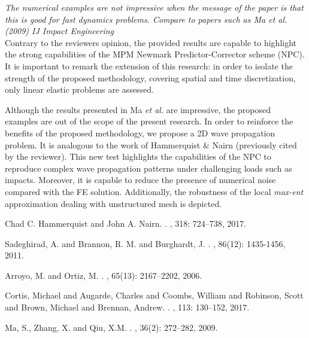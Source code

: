\documentclass[12pt]{article}
\begin{document}
 \textit{The numerical examples are not impressive when the message of the paper is that this is good for fast dynamics problems. Compare to papers such as Ma et al. (2009) IJ Impact Engineering}\\

Contrary to the reviewer\textquotesingle s opinion, the provided results are capable to highlight the strong capabilities of the MPM Newmark Predictor-Corrector scheme (NPC). It is important to remark the extension of this research: in order to isolate the strength of the proposed methodology, covering spatial and time discretization, only linear elastic problems are assessed. 

Although the results presented in Ma {\it et al.} \cite{MA2009272} are impressive, the proposed examples are out of the scope of the present research. In order to reinforce the benefits of the proposed methodology, we propose a 2D wave propagation problem. It is analogous to the work of Hammerquist \& Nairn \cite{HAMMERQUIST2017724} (previously cited by the reviewer). This new test highlights the capabilities of the NPC to reproduce complex wave propagation patterns under challenging loads such as impacts. Moreover, it is capable to reduce the presence of numerical noise compared with the FE solution. Additionally, the robustness of the local \textit{max-ent} approximation dealing with unstructured mesh is depicted.


\begin{thebibliography}{10}

Chad C. Hammerquist and John A. Nairn.
.
,  318: 724--738, 2017.

Sadeghirad, A. and Brannon, R. M. and Burghardt, J.
.
, 86(12): 1435-1456, 2011.

Arroyo, M. and Ortiz, M.
.
,  65(13): 2167--2202, 2006.

Cortis, Michael and Augarde, Charles and Coombs, William and Robinson, Scott and Brown, Michael and Brennan, Andrew.
.
, 113: 130--152, 2017.

Ma, S., Zhang, X.  and  Qiu, X.M.
.
, 36(2): 272--282, 2009.

\end{thebibliography}
\end{document}
